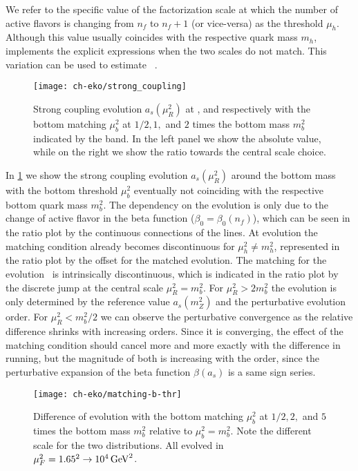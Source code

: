 We refer to the specific value of the factorization scale at which the number
of active flavors is changing from $n_f$ to $n_f+1$ (or vice-versa) as the
threshold $\mu_h$. Although this value usually coincides with the respective
quark mass $m_h$, \eko{} implements the explicit expressions when the two
scales do not match. This variation can be used to estimate \mhou{}~\cite{AbdulKhalek:2019ihb}.

\begin{figure}
    \centering
    \texttt{[image: ch-eko/strong\_coupling]}
    \caption{Strong coupling evolution $a_s(\mu_R^2)$ at \lo{},
    \nlo{} and \nnlo{}
    respectively with the bottom matching $\mu_b^2$ at $1/2, 1,$ and $2$ times the
    bottom mass $m_b^2$ indicated by the band. In the left panel we show the absolute
    value, while on the right we show the ratio towards the central scale choice.
     \label{fig:asmatching}}
\end{figure}

In \cref{fig:asmatching} we show the strong coupling evolution $a_s(\mu_R^2)$
around the bottom mass with the bottom threshold $\mu_b^2$ eventually not coinciding
with the respective bottom quark mass $m_b^2$.
The dependency on the \lo{} evolution is only due to the change of active
flavor in the beta function ($\beta_0 = \beta_0(n_f)$), which can be seen in
the ratio plot by the continuous connections of the lines.
At \nlo{} evolution the matching condition already becomes discontinuous for
$\mu_h^2 \neq m_h^2$, represented in the ratio plot by the offset for the
matched evolution. 
The matching for the \nnlo{} evolution~\cite{Chetyrkin:2005ia,Schroder:2005hy}
is intrinsically discontinuous, which is indicated in the ratio plot by the
discrete jump at the central scale $\mu_R^2 = m_b^2$.
For $\mu_R^2 > 2m_b^2$ the evolution is only determined by the reference value
$a_s(m_Z^2)$ and the perturbative evolution order.
For $\mu_R^2 < m_b^2/2$ we can observe the perturbative convergence as the
relative difference shrinks with increasing orders.
Since it is converging, the effect of the matching condition should cancel more
and more exactly with the difference in running, but the magnitude of both is
increasing with the order, since the perturbative expansion of the beta
function $\beta(a_s)$ is a same sign series.

\begin{figure}
    \centering
    \texttt{[image: ch-eko/matching-b-thr]}
    \caption{Difference of \pdf{} evolution with the bottom matching $\mu_b^2$ at $1/2, 2,$ and
        $5$ times the bottom mass $m_b^2$ relative to $\mu_b^2 = m_b^2$. Note
        the different scale for the two distributions.  All evolved in
        $\muF^2=\SI[parse-numbers=false]{1.65^2\to 10^4}{\GeV^2}$.}
    \label{fig:pdfmatching}
\end{figure}

